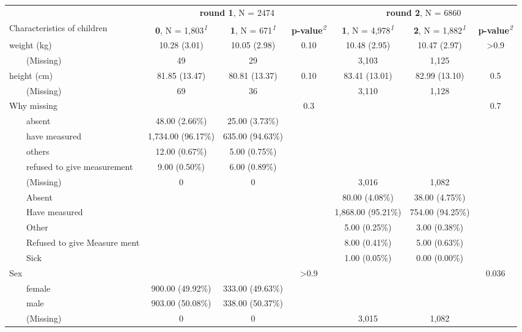\setlength{\LTpost}{0mm}
\begin{longtable}{lcccccc}
\toprule
 & \multicolumn{3}{c}{\textbf{round 1}, N = 2474} & \multicolumn{3}{c}{\textbf{round 2}, N = 6860} \\ 
\cmidrule(lr){2-4} \cmidrule(lr){5-7}
Characteristics of children & \textbf{0}, N = 1,803\textsuperscript{\textit{1}} & \textbf{1}, N = 671\textsuperscript{\textit{1}} & \textbf{p-value}\textsuperscript{\textit{2}} & \textbf{1}, N = 4,978\textsuperscript{\textit{1}} & \textbf{2}, N = 1,882\textsuperscript{\textit{1}} & \textbf{p-value}\textsuperscript{\textit{2}} \\ 
\midrule\addlinespace[2.5pt]
weight (kg) & 10.28 (3.01) & 10.05 (2.98) & 0.10 & 10.48 (2.95) & 10.47 (2.97) & >0.9 \\ 
    (Missing) & 49 & 29 &  & 3,103 & 1,125 &  \\ 
height (cm) & 81.85 (13.47) & 80.81 (13.37) & 0.10 & 83.41 (13.01) & 82.99 (13.10) & 0.5 \\ 
    (Missing) & 69 & 36 &  & 3,110 & 1,128 &  \\ 
Why missing &  &  & 0.3 &  &  & 0.7 \\ 
    absent & 48.00 (2.66\%) & 25.00 (3.73\%) &  &  &  &  \\ 
    have measured & 1,734.00 (96.17\%) & 635.00 (94.63\%) &  &  &  &  \\ 
    others & 12.00 (0.67\%) & 5.00 (0.75\%) &  &  &  &  \\ 
    refused to  give measurement & 9.00 (0.50\%) & 6.00 (0.89\%) &  &  &  &  \\ 
    (Missing) & 0 & 0 &  & 3,016 & 1,082 &  \\ 
    Absent &  &  &  & 80.00 (4.08\%) & 38.00 (4.75\%) &  \\ 
    Have measured &  &  &  & 1,868.00 (95.21\%) & 754.00 (94.25\%) &  \\ 
    Other &  &  &  & 5.00 (0.25\%) & 3.00 (0.38\%) &  \\ 
    Refused to  give Measure ment &  &  &  & 8.00 (0.41\%) & 5.00 (0.63\%) &  \\ 
    Sick &  &  &  & 1.00 (0.05\%) & 0.00 (0.00\%) &  \\ 
Sex &  &  & >0.9 &  &  & 0.036 \\ 
    female & 900.00 (49.92\%) & 333.00 (49.63\%) &  &  &  &  \\ 
    male & 903.00 (50.08\%) & 338.00 (50.37\%) &  &  &  &  \\ 
    (Missing) & 0 & 0 &  & 3,015 & 1,082 &  \\ 

\end{longtable}
